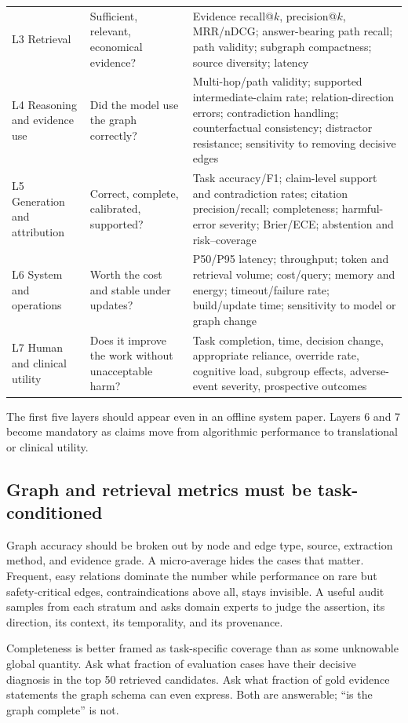 \begin{table}[!t]
\begin{tabularx}{\textwidth}{@{}L{2.4cm} L{3.4cm} Y@{}}
L3 Retrieval & Sufficient, relevant, economical evidence? & Evidence recall@$k$, precision@$k$, MRR/nDCG; answer-bearing path recall; path validity; subgraph compactness; source diversity; latency \\
L4 Reasoning and evidence use & Did the model use the graph correctly? & Multi-hop/path validity; supported intermediate-claim rate; relation-direction errors; contradiction handling; counterfactual consistency; distractor resistance; sensitivity to removing decisive edges \\
L5 Generation and attribution & Correct, complete, calibrated, supported? & Task accuracy/F1; claim-level support and contradiction rates; citation precision/recall; completeness; harmful-error severity; Brier/ECE; abstention and risk--coverage \\
L6 System and operations & Worth the cost and stable under updates? & P50/P95 latency; throughput; token and retrieval volume; cost/query; memory and energy; timeout/failure rate; build/update time; sensitivity to model or graph change \\
L7 Human and clinical utility & Does it improve the work without unacceptable harm? & Task completion, time, decision change, appropriate reliance, override rate, cognitive load, subgroup effects, adverse-event severity, prospective outcomes \\
\bottomrule
\end{tabularx}
\end{table}

The first five layers should appear even in an offline system paper. Layers 6 and 7 become mandatory as claims move from algorithmic performance to translational or clinical utility.

\subsection{Graph and retrieval metrics must be task-conditioned}

Graph accuracy should be broken out by node and edge type, source, extraction method, and evidence grade. A micro-average hides the cases that matter. Frequent, easy relations dominate the number while performance on rare but safety-critical edges, contraindications above all, stays invisible. A useful audit samples from each stratum and asks domain experts to judge the assertion, its direction, its context, its temporality, and its provenance.

Completeness is better framed as task-specific coverage than as some unknowable global quantity. Ask what fraction of evaluation cases have their decisive diagnosis in the top 50 retrieved candidates. Ask what fraction of gold evidence statements the graph schema can even express. Both are answerable; ``is the graph complete'' is not.

